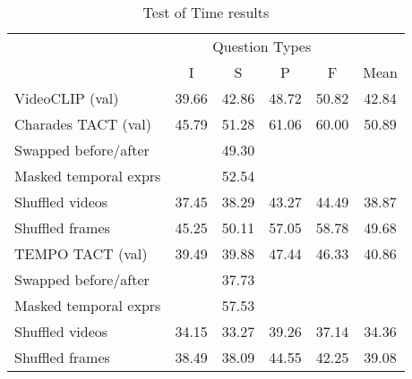 \begin{table}[tp] 
    \centering 
    \caption{Test of Time results}
    \label{tab:tot_star} 
    \begin{tabular}{lccccc} 
        \toprule
        \multicolumn{1}{c}{}    & \multicolumn{4}{c}{Question Types}            & \multicolumn{1}{c}{} \\
                                    \cmidrule(){2-5}
                                & I           & S        & P          & F           & Mean \\
        \cmidrule(r){1-1}           \cmidrule(){2-5}                                    \cmidrule(l){6-6}
        VideoCLIP (val)         & 39.66       & 42.86    & 48.72      & 50.82       & 42.84 \\
		Charades TACT (val)		& 45.79		  & 51.28	 & 61.06	  & 60.00		& 50.89 \\
		Swapped before/after    &			  &	49.30	 &			  &				& \\
		Masked temporal exprs   &			  & 52.54    &			  &				& \\
		Shuffled videos			& 37.45		  & 38.29	 & 43.27	  & 44.49		& 38.87 \\
		Shuffled frames			& 45.25		  & 50.11    & 57.05      & 58.78		& 49.68 \\
        \cmidrule(r){1-1}           \cmidrule(){2-5}                                    \cmidrule(l){6-6}
		TEMPO TACT (val)		& 39.49		  & 39.88	 & 47.44	  & 46.33		& 40.86 \\
		Swapped before/after    &			  & 37.73    &			  &				& \\
		Masked temporal exprs   &			  & 57.53    &			  &				& \\
		Shuffled videos			& 34.15		  & 33.27	 & 39.26	  & 37.14		& 34.36 \\
		Shuffled frames			& 38.49		  & 38.09	 & 44.55	  & 42.25		& 39.08 \\
        \bottomrule
    \end{tabular} 
\end{table} 

